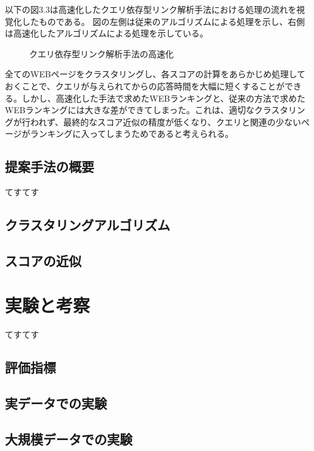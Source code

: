 \documentclass[a4paper,11pt]{jreport}
\begin{document}
以下の図3.3は高速化したクエリ依存型リンク解析手法における処理の流れを視覚化したものである。
図の左側は従来のアルゴリズムによる処理を示し、右側は高速化したアルゴリズムによる処理を示している。

\begin{figure}[htbp]
\begin{center}
\end{center}
\caption{クエリ依存型リンク解析手法の高速化}
\label{figure:sample}
\end{figure}

全てのWEBページをクラスタリングし、各スコアの計算をあらかじめ処理しておくことで、クエリが与えられてからの応答時間を大幅に短くすることができる。しかし、高速化した手法で求めたWEBランキングと、従来の方法で求めたWEBランキングには大きな差ができてしまった。これは、適切なクラスタリングが行われず、最終的なスコア近似の精度が低くなり、クエリと関連の少ないページがランキングに入ってしまうためであると考えられる。

\newpage

\section{提案手法の概要}

てすてす

\section{クラスタリングアルゴリズム}
\section{スコアの近似}

\chapter{実験と考察}

てすてす

\section{評価指標}
\section{実データでの実験}
\section{大規模データでの実験}
\end{document}
